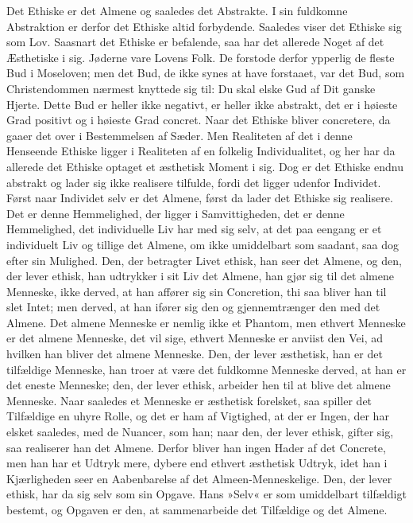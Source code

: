 \documentclass[12pt,a4paper]{article}
\begin{document}
Det Ethiske er det Almene og saaledes det Abstrakte. I sin fuldkomne Abstraktion er derfor det Ethiske altid forbydende. Saaledes viser det Ethiske sig som Lov. Saasnart det Ethiske er befalende, saa har det allerede Noget af det Æsthetiske i sig. Jøderne vare Lovens Folk. De forstode derfor ypperlig de fleste Bud i Moseloven; men det Bud, de ikke synes at have forstaaet, var det Bud, som Christendommen nærmest knyttede sig til: Du skal elske Gud af Dit ganske Hjerte. Dette Bud er heller ikke negativt, er heller ikke abstrakt, det er i høieste Grad positivt og i høieste Grad concret. Naar det Ethiske bliver concretere, da gaaer det over i Bestemmelsen af Sæder. Men Realiteten af det i denne Henseende Ethiske ligger i Realiteten af en folkelig Individualitet, og her har da allerede det Ethiske optaget et æsthetisk Moment i sig. Dog er det Ethiske endnu abstrakt og lader sig ikke realisere tilfulde, fordi det ligger udenfor Individet. Først naar Individet selv er det Almene, først da lader det Ethiske sig realisere. Det er denne Hemmelighed, der ligger i Samvittigheden, det er denne Hemmelighed, det individuelle Liv har med sig selv, at det paa eengang er et individuelt Liv og tillige det Almene, om ikke umiddelbart som saadant, saa dog efter sin Mulighed. Den, der betragter Livet ethisk, han seer det Almene, og den, der lever ethisk, han udtrykker i sit Liv det Almene, han gjør sig til det almene Menneske, ikke derved, at han affører sig sin Concretion, thi saa bliver han til slet Intet; men derved, at han ifører sig den og gjennemtrænger den med det Almene. Det almene Menneske er nemlig ikke et Phantom, men ethvert Menneske er det almene Menneske, det vil sige, ethvert Menneske er anviist den Vei, ad hvilken han bliver det almene Menneske. Den, der lever æsthetisk, han er det tilfældige Menneske, han troer at være det fuldkomne Menneske derved, at han er det eneste Menneske; den, der lever ethisk, arbeider hen til at blive det almene Menneske. Naar saaledes et Menneske er æsthetisk forelsket, saa spiller det Tilfældige en uhyre Rolle, og det er ham af Vigtighed, at der er Ingen, der har elsket saaledes, med de Nuancer, som han; naar den, der lever ethisk, gifter sig, saa realiserer han det Almene. Derfor bliver han ingen Hader af det Concrete, men han har et Udtryk mere, dybere end ethvert æsthetisk Udtryk, idet han i Kjærligheden seer en Aabenbarelse af det Almeen-Menneskelige. Den, der lever ethisk, har da sig selv som sin Opgave. Hans »Selv« er som umiddelbart tilfældigt bestemt, og Opgaven er den, at sammenarbeide det Tilfældige og det Almene.
\end{document}
